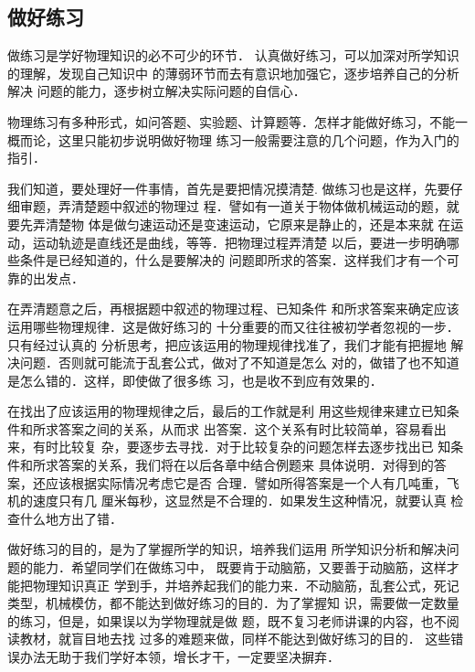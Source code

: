 \subsection*{做好练习}

做练习是学好物理知识的必不可少的环节．
认真做好练习，可以加深对所学知识的理解，发现自己知识中
的薄弱环节而去有意识地加强它，逐步培养自己的分析解决
问题的能力，逐步树立解决实际问题的自信心．

物理练习有多种形式，如问答题、实验题、计算题等．怎样才能做好练习，不能一概而论，这里只能初步说明做好物理
练习一般需要注意的几个问题，作为入门的指引．

    我们知道，要处理好一件事情，首先是要把情况摸清楚.
做练习也是这样，先要仔细审题，弄清楚题中叙述的物理过
程．譬如有一道关于物体做机械运动的题，就要先弄清楚物
体是做匀速运动还是变速运动，它原来是静止的，还是本来就
在运动，运动轨迹是直线还是曲线，等等．把物理过程弄清楚
以后，要进一步明确哪些条件是已经知道的，什么是要解决的
问题即所求的答案．这样我们才有一个可靠的出发点．

    在弄清题意之后，再根据题中叙述的物理过程、已知条件
和所求答案来确定应该运用哪些物理规律．这是做好练习的
十分重要的而又往往被初学者忽视的一步．只有经过认真的
分析思考，把应该运用的物理规律找准了，我们才能有把握地
解决问题．否则就可能流于乱套公式，做对了不知道是怎么
对的，做错了也不知道是怎么错的．这样，即使做了很多练
习，也是收不到应有效果的．

    在找出了应该运用的物理规律之后，最后的工作就是利
用这些规律来建立已知条件和所求答案之间的关系，从而求
出答案．这个关系有时比较简单，容易看出来，有时比较复
杂，要逐步去寻找．对于比较复杂的问题怎样去逐步找出已
知条件和所求答案的关系，我们将在以后各章中结合例题来
具体说明．对得到的答案，还应该根据实际情况考虑它是否
合理．譬如所得答案是一个人有几吨重，飞机的速度只有几
厘米每秒，这显然是不合理的．如果发生这种情况，就要认真
检查什么地方出了错．

    做好练习的目的，是为了掌握所学的知识，培养我们运用
所学知识分析和解决问题的能力．希望同学们在做练习中，
既要肯于动脑筋，又要善于动脑筋，这样才能把物理知识真正
学到手，并培养起我们的能力来．不动脑筋，乱套公式，死记
类型，机械模仿，都不能达到做好练习的目的．为了掌握知
识，需要做一定数量的练习，但是，如果误以为学物理就是做
题，既不复习老师讲课的内容，也不阅读教材，就盲目地去找
过多的难题来做，同样不能达到做好练习的目的．
这些错误办法无助于我们学好本领，增长才干，一定要坚决摒弃．



